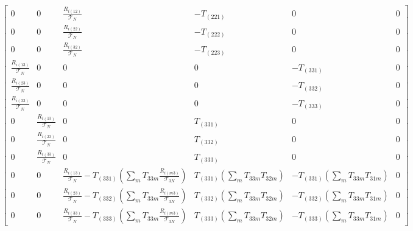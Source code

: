 \begin{landscape}
\begin{equation}
\begin{gathered}
{\begin{bmatrix}
    0 & 0 & \frac{R_{i(12)}}{\mathcal{T}_{N}} & - T_{(221)} & 0 & 0 \\
    0 & 0 & \frac{R_{i(22)}}{\mathcal{T}_{N}} & - T_{(222)} & 0 & 0 \\
    0 & 0 & \frac{R_{i(32)}}{\mathcal{T}_{N}} & - T_{(223)} & 0 & 0 \\


    \frac{R_{i(13)}}{\mathcal{T}_{N}} & 0 & 0 & 0 & - T_{(331)} & 0 \\
    \frac{R_{i(23)}}{\mathcal{T}_{N}} & 0 & 0 & 0 & - T_{(332)} & 0 \\
    \frac{R_{i(33)}}{\mathcal{T}_{N}} & 0 & 0 & 0 & - T_{(333)} & 0 \\

    0 & \frac{R_{i(13)}}{\mathcal{T}_{N}} & 0 & T_{(331)} & 0 & 0\\
    0 & \frac{R_{i(23)}}{\mathcal{T}_{N}} & 0 & T_{(332)} & 0 & 0\\
    0 & \frac{R_{i(33)}}{\mathcal{T}_{N}} & 0 & T_{(333)} & 0 & 0\\

    0 & 0 & \frac{R_{i(13)}}{\mathcal{T}_{N}} -T_{(331)}(\sum_{m}T_{33m}\frac{R_{i(m3)}}{\mathcal{T}_{3N}}) & T_{(331)}(\sum_{m}T_{33m}T_{32m}) & - T_{(331)}(\sum_{m}T_{33m}T_{31m})& 0 \\
    0 & 0 & \frac{R_{i(23)}}{\mathcal{T}_{N}} -T_{(332)}(\sum_{m}T_{33m}\frac{R_{i(m3)}}{\mathcal{T}_{3N}}) & T_{(332)}(\sum_{m}T_{33m}T_{32m}) & - T_{(332)}(\sum_{m}T_{33m}T_{31m})& 0 \\
    0 & 0 & \frac{R_{i(33)}}{\mathcal{T}_{N}} -T_{(333)}(\sum_{m}T_{33m}\frac{R_{i(m3)}}{\mathcal{T}_{3N}}) & T_{(333)}(\sum_{m}T_{33m}T_{32m}) & - T_{(333)}(\sum_{m}T_{33m}T_{31m})& 0
  \end{bmatrix}
}
\end{gathered}\label{eq:interactionmatrixnormalizeddesired}
\end{equation}
\end{landscape}


